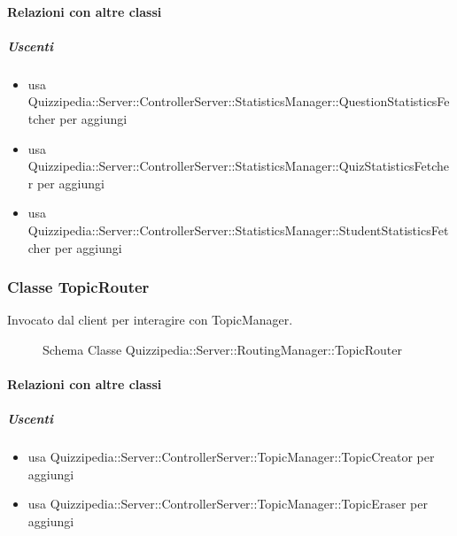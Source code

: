\paragraph{Relazioni con altre classi}
\subparagraph{Uscenti}
\begin{itemize}
\item usa Quizzipedia::Server::ControllerServer::StatisticsManager::QuestionStatisticsFetcher per aggiungi
\item usa Quizzipedia::Server::ControllerServer::StatisticsManager::QuizStatisticsFetcher per aggiungi
\item usa Quizzipedia::Server::ControllerServer::StatisticsManager::StudentStatisticsFetcher per aggiungi
\end{itemize}
\subsubsection{Classe TopicRouter}
Invocato dal client per interagire con TopicManager.
\begin{figure}[H]
\centering
\noindent{}
\caption[Schema Classe TopicRouter]{Schema Classe Quizzipedia::Server::RoutingManager::TopicRouter}
\end{figure}
\paragraph{Relazioni con altre classi}
\subparagraph{Uscenti}
\begin{itemize}
\item usa Quizzipedia::Server::ControllerServer::TopicManager::TopicCreator per aggiungi
\item usa Quizzipedia::Server::ControllerServer::TopicManager::TopicEraser per aggiungi
\end{itemize}
